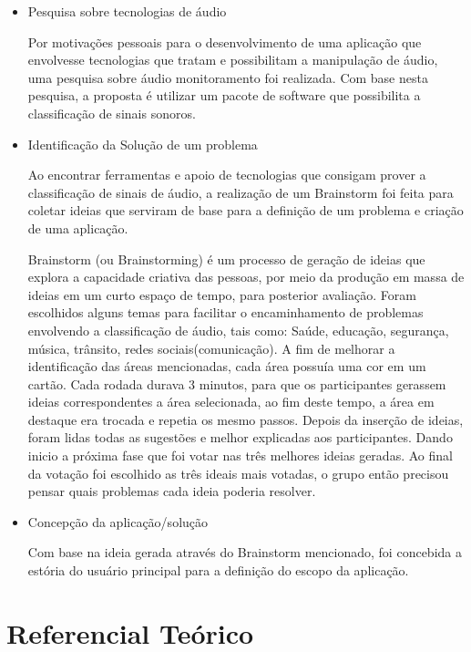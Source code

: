 \begin{itemize}
	\item Pesquisa sobre tecnologias de áudio
	
Por motivações pessoais para o desenvolvimento de uma aplicação que envolvesse tecnologias que tratam e possibilitam a manipulação de áudio, uma pesquisa sobre áudio monitoramento foi realizada.  Com base nesta pesquisa, a proposta é utilizar um pacote de software que possibilita a classificação de sinais sonoros. 

	\item Identificação da Solução de um problema	
	
Ao encontrar ferramentas e apoio de tecnologias que consigam prover a classificação de sinais de áudio,  a realização de um Brainstorm foi feita para coletar ideias que serviram de base para a definição de um problema e criação de uma aplicação.

Brainstorm (ou Brainstorming) é um processo de geração de ideias que explora a capacidade criativa das pessoas,  por meio da produção em massa de ideias em um curto espaço de tempo, para posterior avaliação.  Foram escolhidos alguns temas para facilitar o encaminhamento de problemas envolvendo a classificação de áudio, tais como: Saúde, educação, segurança, música, trânsito, redes sociais(comunicação). A fim de melhorar a identificação das áreas mencionadas, cada área possuía uma cor em um cartão. Cada rodada durava 3 minutos, para que os participantes gerassem ideias correspondentes a área selecionada, ao fim deste tempo, a área em destaque era trocada e repetia os mesmo passos. Depois da inserção de ideias, foram lidas todas as sugestões e melhor explicadas aos participantes. Dando inicio a próxima fase que foi votar nas três melhores ideias geradas. Ao final da votação foi escolhido as três ideais mais votadas, o grupo então precisou pensar quais problemas cada ideia poderia resolver. 
	
	\item Concepção da aplicação/solução
	
Com base na ideia gerada através do Brainstorm mencionado, foi concebida a estória do usuário principal para a definição do escopo da aplicação.
 
\end{itemize}

\section{Referencial Teórico}

